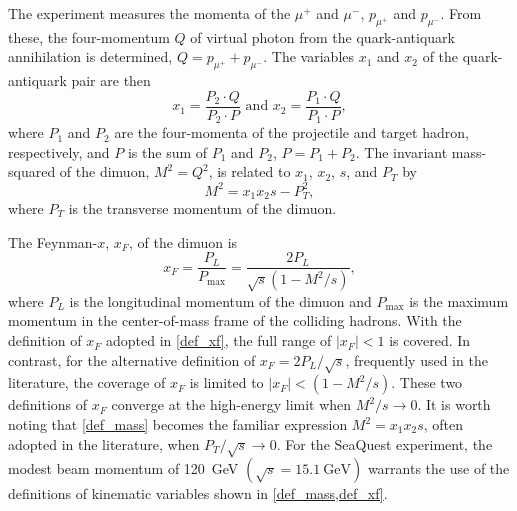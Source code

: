 \documentclass[reprint,aps,unsortedaddress,superscriptaddress,prl,floatfix,showpacs,linenumbers,final]{revtex4-2}
\begin{document}
The experiment measures the momenta of the $\mu^+$ and $\mu^-$, $p_{\mu^+}$ and $p_{\mu^-}$.
From these, the four-momentum $Q$ of virtual photon from the quark-antiquark annihilation is determined,
$Q = p_{\mu^+} + p_{\mu^-}$.
The variables $x_1$ and $x_2$ of the quark-antiquark pair are then
\begin{equation}
	x_1 = \frac{P_2 \cdot Q}{P_2 \cdot P} \text{ and } x_2 =
	\frac{P_1 \cdot Q}{P_1 \cdot P},
	\label{def_x1x2}
\end{equation}
where $P_1$ and $P_2$ are the four-momenta of the projectile and target hadron,
respectively, and $P$ is the sum of $P_1$ and $P_2$, $P=P_1+P_2$.
The invariant mass-squared of the dimuon, $M^2 = Q^2$, is related to $x_1$, $x_2$, $s$, and $P_T$ by
\begin{equation}
	M^2=x_1 x_2 s - P_T^2,
	\label{def_mass}
\end{equation}
where $P_T$ is the transverse momentum of the dimuon.

The Feynman-$x$, $x_F$, of the dimuon is
\begin{equation}
	x_F = \frac{P_L}{P_{\text{max}}} = \frac{2P_L}{\sqrt{s}\left(1-M^2/s\right)},
	\label{def_xf}
\end{equation}
where $P_L$ is the longitudinal momentum of the dimuon and $P_\textrm{max}$ is the maximum momentum in the center-of-mass frame of the colliding hadrons.
With the definition of $x_F$ adopted in \cref{def_xf},
the full range of $\left|x_F\right| < 1$ is covered.
In contrast, for the alternative definition of $x_F = 2P_L/\sqrt{s}$,
frequently used in the literature,
the coverage of $x_F$ is limited to $\left|x_F\right| <\left(1-M^2/s\right)$.
These two definitions of $x_F$ converge at the high-energy limit when $M^2/s \to 0$.
It is worth noting that \cref{def_mass} becomes the familiar expression $M^2=x_1 x_2 s$,
often adopted in the literature, when $P_T/\sqrt{s} \to 0$.
For the SeaQuest experiment, the modest beam momentum of \SI{120}{\GeV} $\left(\sqrt{s} = \SI{15.1}{\GeV}\right)$
warrants the use of the definitions of kinematic variables shown in \cref{def_mass,def_xf}.
\end{document}
